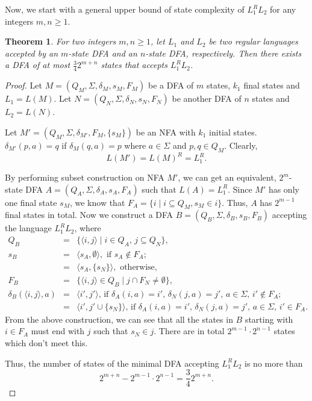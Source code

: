 \documentclass[10pt]{article}
\newtheorem{theorem}{Theorem}
\begin{document}
Now, we start with a general upper bound of state complexity of
$L_1^R L_2$ for any integers $m,n \ge 1$.
\begin{theorem}
\label{L_1^R L_2 upper bound} For two integers $m,n \ge 1$, let
$L_1$ and $L_2$ be two regular languages accepted by an $m$-state
DFA and an $n$-state DFA, respectively. Then there exists a DFA of
at most $\frac{3}{4}2^{m+n}$ states that accepts $L_1^R L_2$.
\end{theorem}
\begin{proof}
Let $M=(Q_M,\Sigma , \delta_M , s_M, F_M)$ be a DFA of $m$ states,
$k_1$ final states and $L_1=L(M)$. Let $N=(Q_N,\Sigma , \delta_N ,
s_N, F_N)$ be another DFA of $n$ states and $L_2=L(N)$.

Let $M'=(Q_M,\Sigma , \delta_{M'} , F_M, \{s_M\})$ be an NFA with
$k_1$ initial states. $\delta_{M'}(p,a)=q$ if $\delta_M(q,a)=p$
where $a\in \Sigma$ and $p,q\in Q_M$. Clearly,
$$L(M')=L(M)^R=L_1^R.$$

By performing subset construction on NFA $M'$, we can get an
equivalent, $2^m$-state DFA $A=(Q_A,\Sigma , \delta_A , s_A, F_A)$
such that $L(A)=L_1^R$. Since $M'$ has only one final state $s_M$,
we know that $F_A=\{i\mid i\subseteq Q_M, s_M\in i\}$. Thus, $A$ has
$2^{m-1}$ final states in total. Now we construct a DFA
$B=(Q_B,\Sigma , \delta_B , s_B, F_B)$ accepting the language $L_1^R
L_2$, where
\begin{eqnarray*}
Q_B & = & \{\langle i,j \rangle \mid i\in Q_A\mbox{, } j\subseteq Q_N\},\\
s_B & = & \langle s_A,\emptyset \rangle, \mbox{ if } s_A \not\in F_A;\\
    & = & \langle s_A, \{s_N\} \rangle, \mbox{ otherwise}, \\
F_B & = & \{\langle i,j \rangle\in Q_B \mid j\cap F_N\neq \emptyset\},\\
\delta_B(\langle i,j \rangle, a) & = & \langle i',j' \rangle \mbox{,
if } \delta_A(i,a)=i'\mbox{, }\delta_N(j,a)=j'\mbox{, }a\in
\Sigma \mbox{, } i'\notin F_A; \\
& = &  \langle i',j'\cup \{s_N\} \rangle \mbox{, if }
\delta_A(i,a)=i'\mbox{, }\delta_N(j,a)=j'\mbox{, }a\in \Sigma
\mbox{, } i'\in F_A.
\end{eqnarray*}
From the above construction, we can see that all the states in $B$
starting with $i\in F_A$ must end with $j$ such that $s_N \in j$.
There are in total $2^{m-1}\cdot 2^{n-1}$ states which don't meet
this.

Thus, the number of states of the minimal DFA accepting $L_1^RL_2$
is no more than
$$2^{m+n}-2^{m-1}\cdot 2^{n-1}=\frac{3}{4}2^{m+n}.$$
\end{proof}
\end{document}
